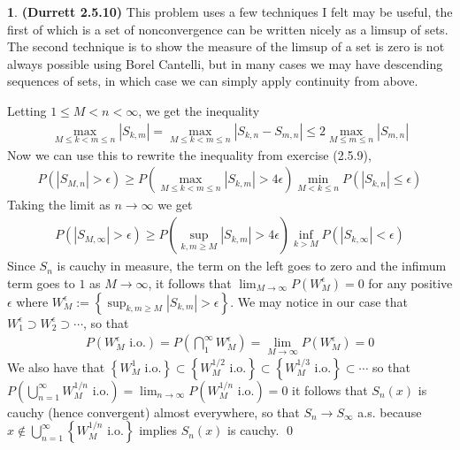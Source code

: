 \documentclass{article}
\theoremstyle{definition}
\newtheorem{pb}{}
\newcommand{\set}[1]{\left\{#1\right\}}
\newcommand{\abs}[1]{\left\vert#1\right\vert}
\begin{document}
    \begin{pb}\textbf{(Durrett 2.5.10)}
        This problem uses a few techniques I felt may be useful, the first of which is a set of nonconvergence can be written nicely as a limsup of sets. The second technique is to show the measure of the limsup of a set is zero is not always possible using Borel Cantelli, but in many cases we may have descending sequences of sets, in which case we can simply apply continuity from above.

        Letting \(1 \leq M < n <\infty\), we get the inequality
        \begin{align*}
            \max_{M \leq k < m \leq n}\abs{S_{k,m}} = \max_{M \leq k < m \leq n} \abs{S_{k,n} - S_{m,n}} \leq 2\max_{M \leq m \leq n}\abs{S_{m,n}}
        \end{align*}
        Now we can use this to rewrite the inequality from exercise (2.5.9),
        \begin{align*}
            P(\abs{S_{M,n}} > \epsilon) \geq P(\max_{M \leq k < m \leq n}\abs{S_{k,m}} > 4 \epsilon)\min_{M < k \leq n}P(\abs{S_{k,n}} \leq \epsilon)
        \end{align*}
        Taking the limit as \(n \to \infty\) we get
        \begin{align*}
            P(\abs{S_{M,\infty}} > \epsilon) \geq P(\sup_{k,m \geq M}\abs{S_{k,m}} > 4 \epsilon)\inf_{k > M}P(\abs{S_{k,\infty}} < \epsilon)
        \end{align*}
        Since \(S_n\) is cauchy in measure, the term on the left goes to zero and the infimum term goes to \(1\) as \(M \to \infty\), it follows that \(\lim_{M \to \infty}P(W^\epsilon_M) = 0\) for any positive \(\epsilon\) where \(W^\epsilon_M := \set{\sup_{k,m \geq M}\abs{S_{k,m}} > \epsilon}\). We may notice in our case that \(W^\epsilon_1 \supset W^\epsilon_2 \supset \cdots\), so that
        \begin{align*}
            P(W_M^\epsilon \text{ i.o.}) = P(\bigcap_1^\infty W_M^\epsilon) = \lim_{M \to \infty} P(W_M^\epsilon) = 0
        \end{align*}
        We also have that \(\set{W_M^{1} \text{ i.o.}} \subset \set{W_M^{1/2} \text{ i.o.}} \subset \set{W_M^{1/3} \text{ i.o.}} \subset \cdots\) so that \(P(\bigcup_{n=1}^\infty W^{1/n}_M \text{ i.o.}) = \lim_{n\to \infty}P(W^{1/n}_M \text{ i.o.}) = 0\) it follows that \(S_n(x)\) is cauchy (hence convergent) almost everywhere, so that \(S_n \to S_\infty\) a.s. because \(x \not \in \bigcup_{n=1}^\infty \set{W^{1/n}_M \text{ i.o.}}\) implies \(S_n(x)\) is cauchy. \qed
    \end{pb}
\end{document}
